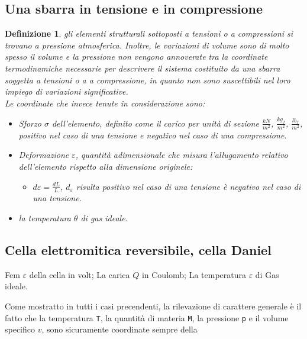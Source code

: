 \documentclass{book}
\newtheorem{defi}{Definizione}
\begin{document}
\subsection{Una sbarra in tensione e in compressione}
\begin{defi}
  gli elementi strutturali sottoposti a tensioni o a compressioni si trovano a pressione atmosferica.
  Inoltre, le variazioni di volume sono di molto spesso il volume e la pressione non vengono annoverate tra la
  coordinate termodinamiche necessarie per descrivere il sistema costituito da una sbarra soggetta a tensioni o
  a a compressione, in quanto non sono suscettibili nel loro impiego di variazioni significative.\\
  Le coordinate che invece tenute in considerazione sono:
  \begin{itemize}
  \item Sforzo $\sigma$ dell'elemento, definito come il carico per unità di sezione $\frac{kN}{m^2}$,
    $\frac{kg_f}{m^2}$, $\frac{lb_f}{m^2}$, positivo nel caso di una tensione e negativo nel caso di una
    compressione.
  \item Deformazione $\varepsilon$, quantità adimensionale che misura l'allugamento relativo dell'elemento
    rispetto alla dimensione originele:
    \begin{itemize}
    	\item $d\varepsilon = \frac{dL}{L}$, $d_\varepsilon$ risulta positivo nel caso di una tensione è
      		negativo nel caso di una tensione.
    \end{itemize}
    \item la temperatura $\theta$ di gas ideale.
  \end{itemize}
  
\end{defi}
\subsection{Cella elettromitica reversibile, cella Daniel}
\begin{tasks}
  \task Fem $\varepsilon$ della cella in volt;
  \task La carica $Q$ in Coulomb;
  \task La temperatura $\varepsilon$ di Gas ideale.
\end{tasks}
Come mostratto in tutti i casi precendenti, la rilevazione di carattere generale è il fatto che la temperatura
{\tt T}, la quantità di materia {\tt M}, la pressione {\tt p} e il volume specifico $v$, sono sicuramente
coordinate sempre della 
\end{document}
